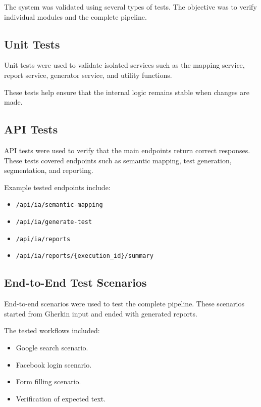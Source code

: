 The system was validated using several types of tests. The objective was to verify individual modules and the complete pipeline.

\subsection{Unit Tests}
\label{subsec:unit_tests}

Unit tests were used to validate isolated services such as the mapping service, report service, generator service, and utility functions.

These tests help ensure that the internal logic remains stable when changes are made.

\subsection{API Tests}
\label{subsec:api_tests}

API tests were used to verify that the main endpoints return correct responses. These tests covered endpoints such as semantic mapping, test generation, segmentation, and reporting.

Example tested endpoints include:

\begin{itemize}
	\item \texttt{/api/ia/semantic-mapping}
	\item \texttt{/api/ia/generate-test}
	\item \texttt{/api/ia/reports}
	\item \texttt{/api/ia/reports/\{execution\_id\}/summary}
\end{itemize}

\subsection{End-to-End Test Scenarios}
\label{subsec:e2e_test_scenarios}

End-to-end scenarios were used to test the complete pipeline. These scenarios started from Gherkin input and ended with generated reports.

The tested workflows included:

\begin{itemize}
	\item Google search scenario.
	\item Facebook login scenario.
	\item Form filling scenario.
	\item Verification of expected text.
\end{itemize}

